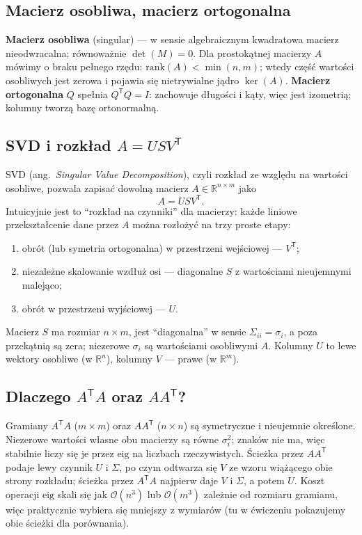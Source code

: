 \documentclass[polish]{template/projectreport}
\begin{document}
\subsection{Macierz osobliwa, macierz ortogonalna}
\textbf{Macierz osobliwa} (singular) --- w sensie algebraicznym kwadratowa macierz nieodwracalna; równoważnie $\det(M)=0$.
Dla prostokątnej macierzy $A$ mówimy o braku pełnego rzędu: $\mathrm{rank}(A)<\min(n,m)$; wtedy część wartości osobliwych jest zerowa i pojawia się nietrywialne jądro $\ker(A)$.
\textbf{Macierz ortogonalna} $Q$ spełnia $Q^{\mathsf T}Q=I$: zachowuje długości i kąty, więc jest izometrią; kolumny tworzą bazę ortonormalną.

\subsection{SVD i rozkład $A=USV^{\mathsf T}$}
SVD (ang.\ \emph{Singular Value Decomposition}), czyli rozkład ze względu na wartości osobliwe, pozwala zapisać dowolną macierz $A\in\mathbb{R}^{n\times m}$ jako
\begin{equation*}
  A = U S V^{\mathsf T}.
\end{equation*}
Intuicyjnie jest to ``rozkład na czynniki'' dla macierzy: każde liniowe przekształcenie dane przez $A$ można rozłożyć na trzy proste etapy:
\begin{enumerate}\itemsep=0pt
  \item obrót (lub symetria ortogonalna) w przestrzeni wejściowej --- $V^{\mathsf T}$;
  \item niezależne skalowanie wzdłuż osi --- diagonalne $S$ z wartościami nieujemnymi malejąco;
  \item obrót w przestrzeni wyjściowej --- $U$.
\end{enumerate}
Macierz $S$ ma rozmiar $n\times m$, jest ``diagonalna'' w sensie $\Sigma_{ii}=\sigma_i$, a poza przekątnią są zera; niezerowe $\sigma_i$ są wartościami osobliwymi $A$.
Kolumny $U$ to lewe wektory osobliwe (w $\mathbb{R}^n$), kolumny $V$ --- prawe (w $\mathbb{R}^m$).

\subsection{Dlaczego $A^{\mathsf T}A$ oraz $AA^{\mathsf T}$?}
Gramiany $A^{\mathsf T}A$ ($m\times m$) oraz $AA^{\mathsf T}$ ($n\times n$) są symetryczne i nieujemnie określone.
Niezerowe wartości własne obu macierzy są równe $\sigma_i^2$; znaków nie ma, więc stabilnie liczy się je przez $\mathrm{eig}$ na liczbach rzeczywistych.
Ścieżka przez $AA^{\mathsf T}$ podaje lewy czynnik $U$ i $\Sigma$, po czym odtwarza się $V$ ze wzoru wiążącego obie strony rozkładu; ścieżka przez $A^{\mathsf T}A$ najpierw daje $V$ i $\Sigma$, a potem $U$.
Koszt operacji $\mathrm{eig}$ skali się jak $\mathcal{O}(n^3)$ lub $\mathcal{O}(m^3)$ zależnie od rozmiaru gramianu, więc praktycznie wybiera się mniejszy z wymiarów (tu w ćwiczeniu pokazujemy obie ścieżki dla porównania).
\end{document}
